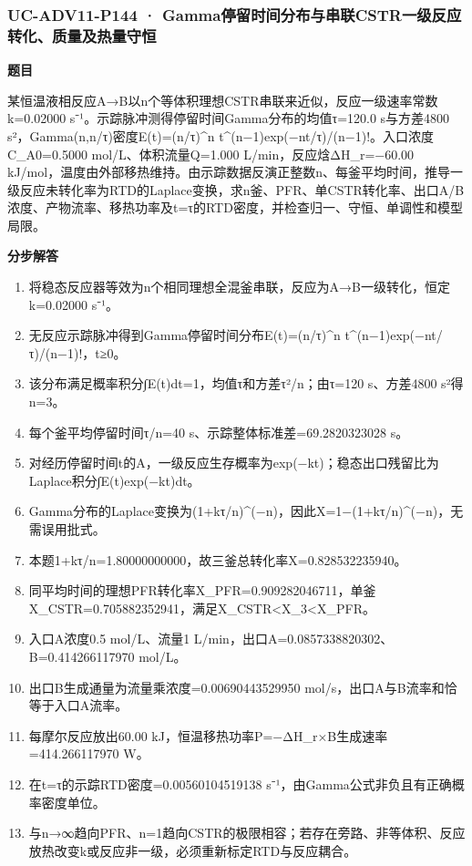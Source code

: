 \documentclass[UTF8,11pt,a4paper]{ctexart}
\begin{document}
\subsubsection*{UC-ADV11-P144 · Gamma停留时间分布与串联CSTR一级反应转化、质量及热量守恒}
\noindent\textbf{题目}\par
某恒温液相反应A→B以n个等体积理想CSTR串联来近似，反应一级速率常数k=0.02000 s⁻¹。示踪脉冲测得停留时间Gamma分布的均值τ=120.0 s与方差4800 s²，Gamma(n,n/τ)密度E(t)=(n/τ)\textasciicircum{}n t\textasciicircum{}(n−1)exp(−nt/τ)/(n−1)!。入口浓度C\_A0=0.5000 mol/L、体积流量Q=1.000 L/min，反应焓ΔH\_r=−60.00 kJ/mol，温度由外部移热维持。由示踪数据反演正整数n、每釜平均时间，推导一级反应未转化率为RTD的Laplace变换，求n釜、PFR、单CSTR转化率、出口A/B浓度、产物流率、移热功率及t=τ的RTD密度，并检查归一、守恒、单调性和模型局限。\par
\medskip\noindent\textbf{分步解答}
\begin{enumerate}
\item 将稳态反应器等效为n个相同理想全混釜串联，反应为A→B一级转化，恒定k=0.02000 s⁻¹。
\item 无反应示踪脉冲得到Gamma停留时间分布E(t)=(n/τ)\textasciicircum{}n t\textasciicircum{}(n−1)exp(−nt/τ)/(n−1)!，t≥0。
\item 该分布满足概率积分∫E(t)dt=1，均值τ和方差τ²/n；由τ=120 s、方差4800 s²得n=3。
\item 每个釜平均停留时间τ/n=40 s、示踪整体标准差=69.2820323028 s。
\item 对经历停留时间t的A，一级反应生存概率为exp(−kt)；稳态出口残留比为Laplace积分∫E(t)exp(−kt)dt。
\item Gamma分布的Laplace变换为(1+kτ/n)\textasciicircum{}(−n)，因此X=1−(1+kτ/n)\textasciicircum{}(−n)，无需误用批式。
\item 本题1+kτ/n=1.80000000000，故三釜总转化率X=0.828532235940。
\item 同平均时间的理想PFR转化率X\_PFR=0.909282046711，单釜X\_CSTR=0.705882352941，满足X\_CSTR<X\_3<X\_PFR。
\item 入口A浓度0.5 mol/L、流量1 L/min，出口A=0.0857338820302、B=0.414266117970 mol/L。
\item 出口B生成通量为流量乘浓度=0.00690443529950 mol/s，出口A与B流率和恰等于入口A流率。
\item 每摩尔反应放出60.00 kJ，恒温移热功率P=−ΔH\_r×B生成速率=414.266117970 W。
\item 在t=τ的示踪RTD密度=0.00560104519138 s⁻¹，由Gamma公式非负且有正确概率密度单位。
\item 与n→∞趋向PFR、n=1趋向CSTR的极限相容；若存在旁路、非等体积、反应放热改变k或反应非一级，必须重新标定RTD与反应耦合。
\end{enumerate}
\end{document}
